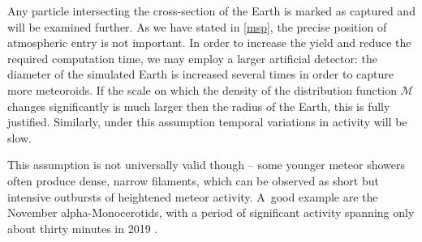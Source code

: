 %
%
%
%


        Any particle intersecting the cross-section of the Earth is marked as captured and will be examined further.
        As we have stated in \cref{msp}, the precise position of atmospheric entry is not important.
        In order to increase the yield and reduce the required computation time, we may employ a larger artificial detector:
        the diameter of the simulated Earth is increased several times in order to capture more meteoroids.
        If the scale on which the density of the distribution function $\mathcal{M}$ changes significantly
        is much larger then the radius of the Earth, this is fully justified.
        Similarly, under this assumption temporal variations in activity will be slow.

        This assumption is not universally valid though -- some younger meteor showers often produce dense, narrow filaments,
        which can be observed as short but intensive outbursts of heightened meteor activity.
        A~good example are the November alpha-Monocerotids, with a period of significant
        activity spanning only about thirty minutes in 2019 \citep{imo-cbet4692}.

